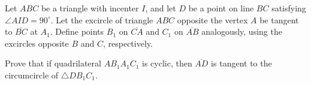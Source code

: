 Let $ABC$ be a triangle with incenter $I$, and let $D$ be a point on line $BC$ satisfying $\angle AID=90^{\circ}$. Let the excircle of triangle $ABC$ opposite the vertex $A$ be tangent to $\overline{BC}$ at $A_1$. Define points $B_1$ on $\overline{CA}$ and $C_1$ on $\overline{AB}$ analogously, using the excircles opposite $B$ and $C$, respectively. 

Prove that if quadrilateral $AB_1A_1C_1$ is cyclic, then $\overline{AD}$ is tangent to the circumcircle of $\triangle DB_1C_1$.